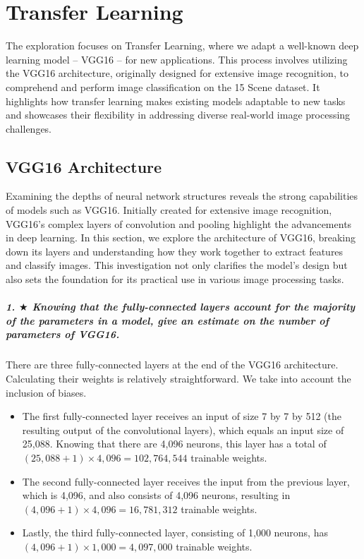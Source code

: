 \chapter{Transfer Learning}
\graphicspath{{figs/2a/}}

The exploration focuses on Transfer Learning, where we adapt a well-known deep learning model -- VGG16 -- for new applications. This process involves utilizing the VGG16 architecture, originally designed for extensive image recognition, to comprehend and perform image classification on the 15 Scene dataset. It highlights how transfer learning makes existing models adaptable to new tasks and showcases their flexibility in addressing diverse real-world image processing challenges.

\section{VGG16 Architecture}

Examining the depths of neural network structures reveals the strong capabilities of models such as VGG16. Initially created for extensive image recognition, VGG16's complex layers of convolution and pooling highlight the advancements in deep learning. In this section, we explore the architecture of VGG16, breaking down its layers and understanding how they work together to extract features and classify images. This investigation not only clarifies the model's design but also sets the foundation for its practical use in various image processing tasks.

\paragraph{1. $\bigstar$ Knowing that the fully-connected layers account for the majority of the parameters in a model, give an estimate on the number of parameters of VGG16.}

There are three fully-connected layers at the end of the VGG16 architecture. Calculating their weights is relatively straightforward. We take into account the inclusion of biases.

\begin{itemize}
    \item The first fully-connected layer receives an input of size 7 by 7 by 512 (the resulting output of the convolutional layers), which equals an input size of 25,088. Knowing that there are 4,096 neurons, this layer has a total of $(25,088 + 1) \times 4,096 = 102,764,544$ trainable weights.
    \item The second fully-connected layer receives the input from the previous layer, which is 4,096, and also consists of 4,096 neurons, resulting in $(4,096 + 1) \times 4,096 = 16,781,312$ trainable weights.
    \item Lastly, the third fully-connected layer, consisting of 1,000 neurons, has $(4,096 + 1) \times 1,000 = 4,097,000$ trainable weights.
\end{itemize}

